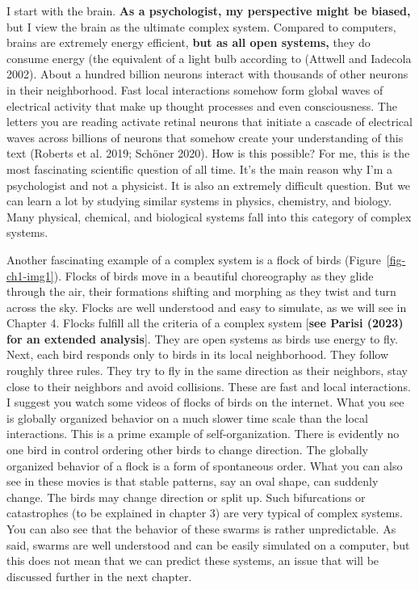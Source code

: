 \documentclass[
  letterpaper,
]{scrbook}
\begin{document}
I start with the brain. \textbf{As a psychologist, my perspective might
be biased,} but I view the brain as the ultimate complex system.
Compared to computers, brains are extremely energy efficient,
\textbf{but as all open systems,} they do consume energy (the equivalent
of a light bulb according to (Attwell and Iadecola 2002). About a
hundred billion neurons interact with thousands of other neurons in
their neighborhood. Fast local interactions somehow form global waves of
electrical activity that make up thought processes and even
consciousness. The letters you are reading activate retinal neurons that
initiate a cascade of electrical waves across billions of neurons that
somehow create your understanding of this text (Roberts et al. 2019;
Schöner 2020). How is this possible? For me, this is the most
fascinating scientific question of all time. It's the main reason why
I'm a psychologist and not a physicist. It is also an extremely
difficult question. But we can learn a lot by studying similar systems
in physics, chemistry, and biology. Many physical, chemical, and
biological systems fall into this category of complex systems.

Another fascinating example of a complex system is a flock of birds
(Figure~\ref{fig-ch1-img1}). Flocks of birds move in a beautiful
choreography as they glide through the air, their formations shifting
and morphing as they twist and turn across the sky. Flocks are well
understood and easy to simulate, as we will see in Chapter 4. Flocks
fulfill all the criteria of a complex system {[}\textbf{see Parisi
(2023) for an extended analysis}{]}. They are open systems as birds use
energy to fly. Next, each bird responds only to birds in its local
neighborhood. They follow roughly three rules. They try to fly in the
same direction as their neighbors, stay close to their neighbors and
avoid collisions. These are fast and local interactions. I suggest you
watch some videos of flocks of birds on the internet. What you see is
globally organized behavior on a much slower time scale than the local
interactions. This is a prime example of self-organization. There is
evidently no one bird in control ordering other birds to change
direction. The globally organized behavior of a flock is a form of
spontaneous order. What you can also see in these movies is that stable
patterns, say an oval shape, can suddenly change. The birds may change
direction or split up. Such bifurcations or catastrophes (to be
explained in chapter 3) are very typical of complex systems. You can
also see that the behavior of these swarms is rather unpredictable. As
said, swarms are well understood and can be easily simulated on a
computer, but this does not mean that we can predict these systems, an
issue that will be discussed further in the next chapter.
\end{document}
